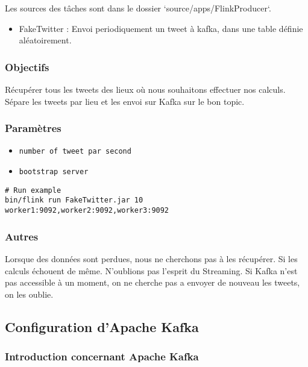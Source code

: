 \documentclass[a4paper,oneside,12pt]{article}
\begin{document}
Les sources des tâches sont dans le dossier `source/apps/FlinkProducer`. 

\begin{itemize}
\item FakeTwitter : Envoi periodiquement un tweet à kafka, dans une table définie aléatoirement. 
\end{itemize} 


\subsubsection{Objectifs}

Récupérer tous les tweets des lieux où nous souhaitons effectuer nos calculs. Sépare les tweets par lieu et les envoi sur Kafka sur le bon topic. 


\subsubsection{Paramètres}

\begin{itemize}
\item \verb!number of tweet par second! 
\item \verb!bootstrap server!
\end{itemize}

\begin{verbatim}
# Run example
bin/flink run FakeTwitter.jar 10 worker1:9092,worker2:9092,worker3:9092
\end{verbatim}

\subsubsection{Autres}

Lorsque des données sont perdues, nous ne cherchons pas à les récupérer. Si les calculs échouent de même. N'oublions pas l'esprit du Streaming. 
Si Kafka n'est pas accessible à un moment, on ne cherche pas a envoyer de nouveau les tweets, on les oublie. 



\pagebreak
\subsection{Configuration d'Apache Kafka}

\subsubsection{Introduction concernant Apache Kafka}
\end{document}

